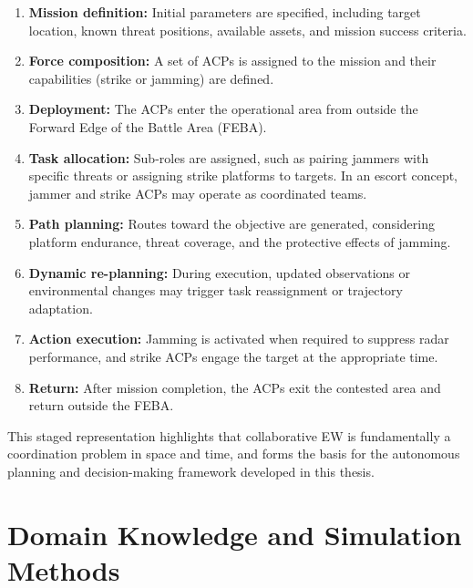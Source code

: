 \begin{enumerate}
    \item \textbf{Mission definition:} Initial parameters are specified, including target location, known threat positions, available assets, and mission success criteria.
    
    \item \textbf{Force composition:} A set of ACPs is assigned to the mission and their capabilities (strike or jamming) are defined.
    
    \item \textbf{Deployment:} The ACPs enter the operational area from outside the Forward Edge of the Battle Area (FEBA).
    
    \item \textbf{Task allocation:} Sub-roles are assigned, such as pairing jammers with specific threats or assigning strike platforms to targets. In an escort concept, jammer and strike ACPs may operate as coordinated teams.
    
    \item \textbf{Path planning:} Routes toward the objective are generated, considering platform endurance, threat coverage, and the protective effects of jamming.
    
    \item \textbf{Dynamic re-planning:} During execution, updated observations or environmental changes may trigger task reassignment or trajectory adaptation.
    
    \item \textbf{Action execution:} Jamming is activated when required to suppress radar performance, and strike ACPs engage the target at the appropriate time.
    
    \item \textbf{Return:} After mission completion, the ACPs exit the contested area and return outside the FEBA.
    
\end{enumerate}

This staged representation highlights that collaborative EW is fundamentally a coordination problem in space and time, and forms the basis for the autonomous planning and decision-making framework developed in this thesis.






\chapter{Domain Knowledge and Simulation Methods}

